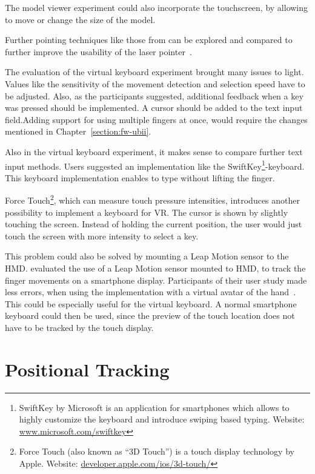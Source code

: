 The model viewer experiment could also incorporate the touchscreen, by allowing to move or change the size of the model.

Further pointing techniques like those from \citeauthor{Argelaguet.2013} can be explored and compared to further improve the usability of the laser pointer~\cite[123]{Argelaguet.2013}.

The evaluation of the virtual keyboard experiment brought many issues to light. 
Values like the sensitivity of the movement detection and selection speed have to be adjusted. Also, as the participants suggested, additional feedback when a key was pressed should be implemented. A cursor should be added to the text input field.Adding support for using multiple fingers at once, would require the changes mentioned in Chapter~\ref{section:fw-ubii}.

Also in the virtual keyboard experiment, it makes sense to compare further text input methods. Users suggested an implementation like the SwiftKey\footnote{SwiftKey by Microsoft is an application for smartphones which allows to highly customize the keyboard and introduce swiping based typing. Website: \href{https://www.microsoft.com/swiftkey}{www.microsoft.com/swiftkey}}-keyboard. This keyboard implementation enables to type without lifting the finger. 

Force Touch\footnote{Force Touch (also known as \enquote{3D Touch}) is a touch display technology by Apple. Website: \href{https://developer.apple.com/ios/3d-touch/}{developer.apple.com/ios/3d-touch/}}, which can measure touch pressure intensities, introduces another possibility to implement a keyboard for \ac{VR}. The cursor is shown by slightly touching the screen. Instead of holding the current position, the user would just touch the screen with more intensity to select a key. 

This problem could also be solved by mounting a Leap Motion sensor to the \ac{HMD}. \citeauthor{Afonso.2017} evaluated the use of a Leap Motion sensor mounted to \ac{HMD}, to track the finger movements on a smartphone display. Participants of their user study made less errors, when using the implementation with a virtual avatar of the hand~\cite[247\psq]{Afonso.2017}. This could be especially useful for the virtual keyboard. A normal smartphone keyboard could then be used, since the preview of the touch location does not have to be tracked by the touch display.



\section{Positional Tracking}\label{section:fw-positional-tracking}

